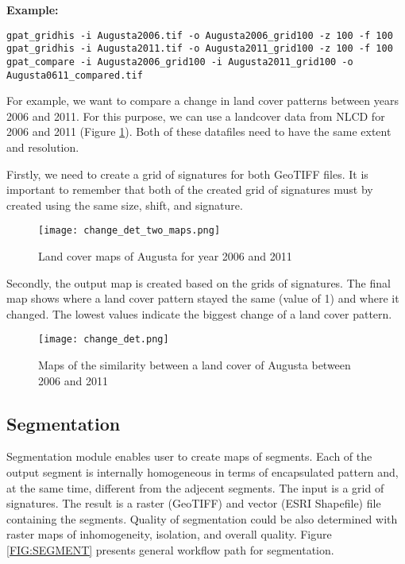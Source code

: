 {\bf Example:}

\begin{minipage}{\linewidth}
\begin{lstlisting}
gpat_gridhis -i Augusta2006.tif -o Augusta2006_grid100 -z 100 -f 100
gpat_gridhis -i Augusta2011.tif -o Augusta2011_grid100 -z 100 -f 100
gpat_compare -i Augusta2006_grid100 -i Augusta2011_grid100 -o Augusta0611_compared.tif
\end{lstlisting}
\end{minipage}

For example, we want to compare a change in land cover patterns between years 2006 and 2011. 
For this purpose, we can use a landcover data from NLCD for 2006 and 2011 (Figure \ref{FIG:CHANGEDET1}).
Both of these datafiles need to have the same extent and resolution.

Firstly, we need to create a grid of signatures for both GeoTIFF files.
It is important to remember that both of the created grid of signatures must by created using the same size, shift, and signature.

\begin{figure}[H]
	\centering
	\texttt{[image: change\_det\_two\_maps.png]}
	\caption{Land cover maps of Augusta for year 2006 and 2011}
	\label{FIG:CHANGEDET1}
\end{figure}

Secondly, the output map is created based on the grids of signatures.
The final map shows where a land cover pattern stayed the same (value of 1) and where it changed. 
The lowest values indicate the biggest change of a land cover pattern.

\begin{figure}[H]
	\centering
	\texttt{[image: change\_det.png]}
	\caption{Maps of the similarity between a land cover of Augusta between 2006 and 2011}
	\label{FIG:CHANGEDET2}
\end{figure}

\FloatBarrier

\subsection{Segmentation}

Segmentation module enables user to create maps of segments.
Each of the output segment is internally homogeneous in terms of encapsulated pattern and, at the same time, different from the adjecent segments.
The input is a grid of signatures.
The result is a raster (GeoTIFF) and vector (ESRI Shapefile) file containing the segments.
Quality of segmentation could be also determined with raster maps of inhomogeneity, isolation, and overall quality.
Figure \ref{FIG:SEGMENT} presents general workflow path for segmentation. 

